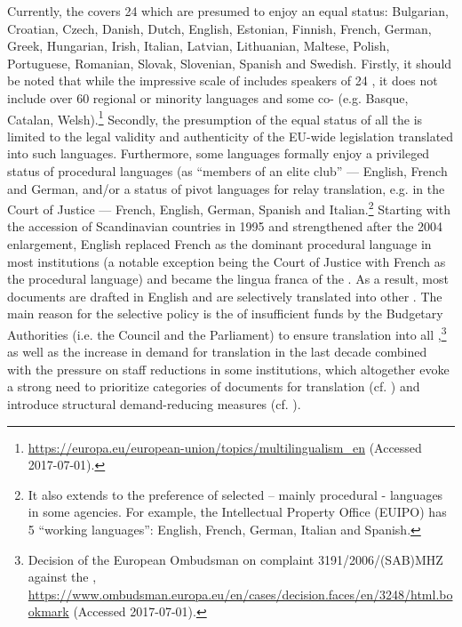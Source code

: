 \documentclass[output=paper]{langsci/langscibook}
\begin{document}
Currently, the   covers 24  which are presumed to enjoy an equal status: Bulgarian, Croatian, Czech, Danish, Dutch, English, Estonian, Finnish, French, German, Greek, Hungarian, Irish, Italian, Latvian, Lithuanian, Maltese, Polish, Portuguese, Romanian, Slovak, Slovenian, Spanish and Swedish. Firstly, it should be noted that while the impressive scale of   includes speakers of 24 , it does not include over 60 regional or minority languages and some co- (e.g. Basque, Catalan, Welsh).\footnote{\url{https://europa.eu/european-union/topics/multilingualism_en} (Accessed 2017-07-01).} Secondly, the presumption of the equal status of all the  is limited to the legal validity and authenticity of the EU-wide legislation translated into such languages. Furthermore, some languages formally enjoy a privileged status of procedural languages (as “members of an elite club” \citep[560]{Craith2006} — English, French and German, and/or a status of pivot languages for relay translation, e.g. in the Court of Justice — French, English, German, Spanish and Italian.\footnote{It also extends to the preference of selected – mainly procedural - languages in some  agencies. For example, the  Intellectual Property Office (EUIPO) has 5 ``working languages'': English, French, German, Italian and Spanish.} Starting with the accession of Scandinavian countries in 1995 and strengthened after the 2004 enlargement, English replaced French as the dominant procedural language in most  institutions (a notable exception being the Court of Justice with French as the procedural language) and became the lingua franca of the . As a result, most documents are drafted in English and are selectively translated into other . The main reason for the selective policy is the  of insufficient funds by the  Budgetary Authorities (i.e. the Council and the Parliament) to ensure translation into all ,\footnote{Decision of the European Ombudsman on complaint 3191/2006/(SAB)MHZ against the , \url{https://www.ombudsman.europa.eu/en/cases/decision.faces/en/3248/html.bookmark} (Accessed 2017-07-01).} as well as the increase in demand for translation in the last decade combined with the pressure on staff reductions in some institutions, which altogether evoke a strong need to prioritize categories of documents for translation (cf. \citeauthor[4]{DGT2016b}) and introduce structural demand-reducing measures (cf. \citealt{Strandvik2017}).
\end{document}
